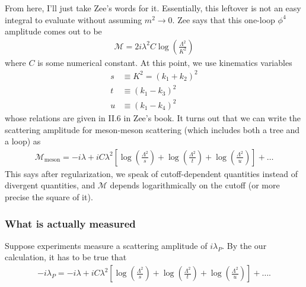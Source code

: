 \documentclass{book}
\theoremstyle{definition}
\newcommand{\f}[2]{\frac{#1}{#2}}
\newcommand{\lp}{\left(}
\newcommand{\rp}{\right)}
\newcommand{\lb}{\left[}
\newcommand{\rb}{\right]}
\begin{document}
From here, I'll just take Zee's words for it. Essentially, this leftover is not an easy integral to evaluate without assuming $m^2 \to 0$. Zee says that this one-loop $\phi^4$ amplitude comes out to be
\begin{align}
\boxed{\mathcal{M} = 2i\lambda^2C \log \lp \f{\Lambda^2}{K^2} \rp}
\end{align}
where $C$ is some numerical constant. At this point, we use kinematics variables
\begin{align}
s &\equiv K^2 = (k_1 + k_2)^2\\
t &\equiv (k_1 - k_3)^2\\
u &\equiv (k_1 - k_4)^2
\end{align}
whose relations are given in II.6 in Zee's book. It turns out that we can write the scattering amplitude for meson-meson scattering (which includes both a tree and a loop) as
\begin{align}
\boxed{\mathcal{M}_{\text{meson}} = -i\lambda + iC\lambda^2\lb  \log\lp \f{\Lambda^2}{s} \rp + \log\lp \f{\Lambda^2}{t} \rp + \log\lp \f{\Lambda^2}{u} \rp \rb + \dots}
\end{align}
This says after regularization, we speak of cutoff-dependent quantities instead of divergent quantities, and $\mathcal{M}$ depends logarithmically on the cutoff (or more precise the square of it).



















\subsubsection{What is actually measured}



Suppose experiments measure a scattering amplitude of $i\lambda_P$. By the our calculation, it has to be true that
\begin{align}
-i\lambda_P = -i\lambda + iC\lambda^2\lb  \log\lp \f{\Lambda^2}{s} \rp + \log\lp \f{\Lambda^2}{t} \rp + \log\lp \f{\Lambda^2}{u} \rp \rb + \dots.
\end{align}
\end{document}

